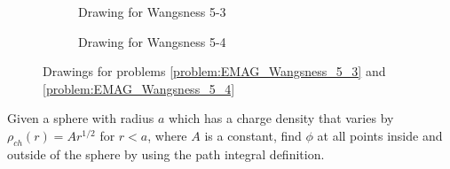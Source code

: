             \begin{figure}[H]
                \centering
                \captionsetup{type=figure}
                \begin{subfigure}[b]{0.49\textwidth}
                    \centering
                    
                    \caption{Drawing for Wangsness 5-3}
                    \label{fig:EMAG_Wangsness_5_3}
                \end{subfigure}
                \begin{subfigure}[b]{0.49\textwidth}
                    \centering
                    
                    \caption{Drawing for Wangsness 5-4}
                    \label{fig:EMAG_Wangsness_5_4}
                \end{subfigure}
                \caption{%
                    Drawings for problems
                    \ref{problem:EMAG_Wangsness_5_3}
                    and
                    \ref{problem:EMAG_Wangsness_5_4}
                }
            \end{figure}
            \begin{problem}[Wangsness 5-10]
                Given a sphere with radius $a$ which has
                a charge density that varies by
                $\rho_{ch}(r)=Ar^{1/2}$ for $r<a$, where $A$
                is a constant, find $\phi$ at all points inside
                and outside of the sphere by using the path
                integral definition.
            \end{problem}

